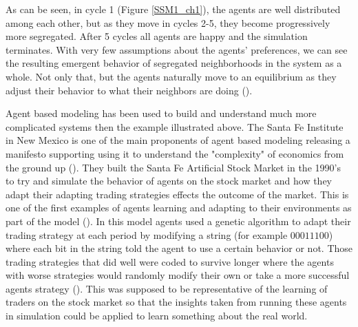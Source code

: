 \documentclass[12pt,twoside]{reedthesis}
\begin{document}
As can be seen, in cycle 1 (Figure \ref{SSM1_ch1}), the agents are well distributed among each other, but as they move in cycles 2-5, they become progressively more segregated. After 5 cycles all agents are happy and the simulation terminates. With very few assumptions about the agents' preferences, we can see the resulting emergent behavior of segregated neighborhoods in the system as a whole. Not only that, but the agents naturally move to an equilibrium as they adjust their behavior to what their neighbors are doing (\cite{Sargent2019}). 

Agent based modeling has been used to build and understand much more complicated systems then the example illustrated above. The Santa Fe Institute in New Mexico is one of the main proponents of agent based modeling releasing a manifesto supporting using it to understand the "complexity" of economics from the ground up (\citealp{Backhouse2016}). They built the Santa Fe Artificial Stock Market in the 1990's to try and simulate the behavior of agents on the stock market and how they adapt their adapting trading strategies effects the outcome of the market. This is one of the first examples of agents learning and adapting to their environments as part of the model (\cite{LeBaron2002}). In this model agents used a genetic algorithm to adapt their trading strategy at each period by modifying a string (for example $00011100$) where each bit in the string told the agent to use a certain behavior or not. Those trading strategies that did well were coded to survive longer where the agents with worse strategies would randomly modify their own or take a more successful agents strategy (\cite{Arthur1992}). This was supposed to be representative of the learning of traders on the stock market so that the insights taken from running these agents in simulation could be applied to learn something about the real world. 
\end{document}
